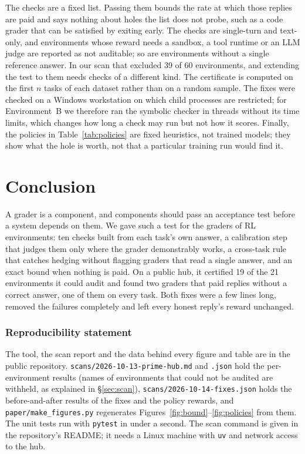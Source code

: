 The checks are a fixed list. Passing them bounds the rate at which those replies are paid and says nothing about holes the list does not probe, such as a code grader that can be satisfied by exiting early. The checks are single-turn and text-only, and environments whose reward needs a sandbox, a tool runtime or an LLM judge are reported as not auditable; so are environments without a single reference answer. In our scan that excluded 39 of 60 environments, and extending the test to them needs checks of a different kind. The certificate is computed on the first $n$ tasks of each dataset rather than on a random sample. The fixes were checked on a Windows workstation on which child processes are restricted; for Environment~B we therefore ran the symbolic checker in threads without its time limits, which changes how long a check may run but not how it scores. Finally, the policies in Table~\ref{tab:policies} are fixed heuristics, not trained models; they show what the hole is worth, not that a particular training run would find it.

\section{Conclusion}
\label{sec:conclusion}

A grader is a component, and components should pass an acceptance test before a system depends on them. We gave such a test for the graders of RL environments: ten checks built from each task's own answer, a calibration step that judges them only where the grader demonstrably works, a cross-task rule that catches hedging without flagging graders that read a single answer, and an exact bound when nothing is paid. On a public hub, it certified 19 of the 21 environments it could audit and found two graders that paid replies without a correct answer, one of them on every task. Both fixes were a few lines long, removed the failures completely and left every honest reply's reward unchanged.

\subsubsection*{Reproducibility statement}
The tool, the scan report and the data behind every figure and table are in the public repository. \texttt{scans/2026-10-13-prime-hub.md} and \texttt{.json} hold the per-environment results (names of environments that could not be audited are withheld, as explained in \S\ref{sec:scan}), \texttt{scans/2026-10-14-fixes.json} holds the before-and-after results of the fixes and the policy rewards, and \texttt{paper/make\_figures.py} regenerates Figures~\ref{fig:bound}--\ref{fig:policies} from them. The unit tests run with \texttt{pytest} in under a second. The scan command is given in the repository's README; it needs a Linux machine with \texttt{uv} and network access to the hub.


